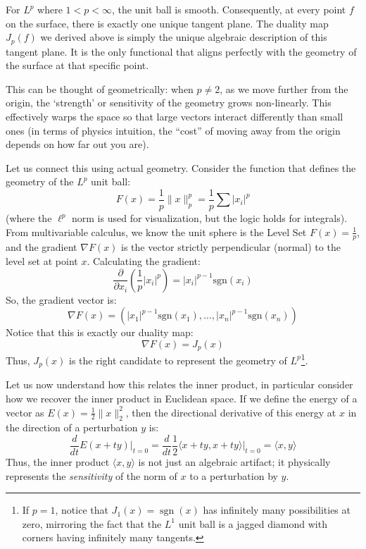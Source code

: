 \documentclass{article}
\newcommand{\sgn}{{\operatorname{sgn}}}
\begin{document}
For $L^p$ where $1 < p < \infty$, the unit ball is smooth. Consequently, at every point $f$ on
the surface, there is exactly one unique tangent plane. The duality map $J_p(f)$ we derived above is simply
the unique algebraic description of this tangent plane. It is the only functional that aligns perfectly with
the geometry of the surface at that specific point.


This can be thought of geometrically: when $p \ne 2$, as we move further from the origin, the `strength'
or sensitivity of the geometry grows non-linearly. This effectively warps the space so that large vectors
interact differently than small ones (in terms of physics intuition, the ``cost'' of moving away from the
origin depends on how far out you are).

Let us connect this using actual geometry. Consider the function that defines the geometry of the $L^p$ unit ball:
\[
F(x) = \frac{1}{p} \|x\|_p^p = \frac{1}{p} \sum |x_i|^p
\]
(where the $\ell^p$ norm is used for visualization, but the logic holds for integrals).
From multivariable calculus, we know the unit sphere is the Level Set $F(x) = \frac{1}{p}$, and the gradient
$\nabla F(x)$ is the vector strictly perpendicular (normal) to the level set at point $x$.
Calculating the gradient:
\[
\frac{\partial}{\partial x_i} \left( \frac{1}{p} |x_i|^p \right) = |x_i|^{p-1} \text{sgn}(x_i)
\]
So, the gradient vector is:
\[
\nabla F(x) = \left( |x_1|^{p-1}\text{sgn}(x_1), \dots, |x_n|^{p-1}\text{sgn}(x_n) \right)
\]
Notice that this is exactly our duality map:
\[
\nabla F(x) = J_p(x)
\]
Thus, $J_p(x)$ is the right candidate to represent the geometry of $L^p$\footnote{If $p = 1$,
notice that $J_1(x) = \sgn(x)$ has infinitely many possibilities at zero, mirroring the fact that the $L^1$ unit ball
is a jagged diamond with corners having infinitely many tangents.}.

Let us now understand how this relates the inner product, in particular consider how we recover the
inner product in Euclidean space. If we define the energy of a vector as $E(x) = \frac{1}{2}\|x\|_2^2$, then
the directional derivative of this energy at $x$ in the direction of a perturbation $y$ is:
\[
	\frac{d}{dt} E(x + ty) \Big|_{t=0} = \frac{d}{dt} \frac{1}{2} \langle x+ty, x+ty \rangle \Big|_{t=0} = \langle x, y \rangle
\]
Thus, the inner product $\langle x, y \rangle$ is not just an algebraic artifact; it physically represents
the \emph{sensitivity} of the norm of $x$ to a perturbation by $y$.
\end{document}
